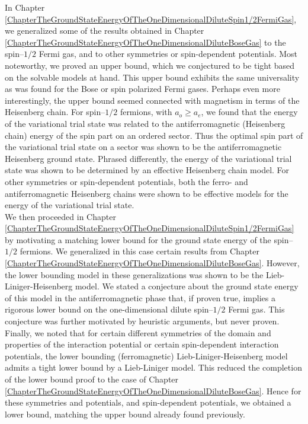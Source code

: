 In Chapter \ref{ChapterTheGroundStateEnergyOfTheOneDimensionalDiluteSpin1/2FermiGas}, we generalized some of the results obtained in Chapter \ref{ChapterTheGroundStateEnergyOfTheOneDimensionalDiluteBoseGas} to the spin--$ 1/2 $ Fermi gas, and to other symmetries or spin-dependent potentials. Most noteworthy, we proved an upper bound, which we conjectured to be tight based on the solvable models at hand. This upper bound exhibits the same universality as was found for the Bose or spin polarized Fermi gases. Perhaps even more interestingly, the upper bound seemed connected with magnetism in terms of the Heisenberg chain. For spin--$ 1/2 $ fermions, with $ a_o\geq a_e $, we found that the energy of the variational trial state was related to the antiferromagnetic (Heisenberg chain) energy of the spin part on an ordered sector. Thus the optimal spin part of the variational trial state on a sector was shown to be the antiferromagnetic Heisenberg ground state. Phrased differently, the energy of the variational trial state was shown to be determined by an effective Heisenberg chain model. For other symmetries or spin-dependent potentials, both the ferro- and antiferromagnetic Heisenberg chains were shown to be effective models for the energy of the variational trial state.\\
We then proceeded in Chapter \ref{ChapterTheGroundStateEnergyOfTheOneDimensionalDiluteSpin1/2FermiGas} by motivating a matching lower bound for the ground state energy of the spin--$ 1/2 $ fermions. We generalized in this case certain results from Chapter \ref{ChapterTheGroundStateEnergyOfTheOneDimensionalDiluteBoseGas}. However, the lower bounding model in these generalizations was shown to be the Lieb-Liniger-Heisenberg model. We stated a conjecture about the ground state energy of this model in the antiferromagnetic phase that, if proven true, implies a rigorous lower bound on the one-dimensional dilute spin--$ 1/2 $ Fermi gas. This conjecture was further motivated by heuristic arguments, but never proven. Finally, we noted that for certain different symmetries of the domain and properties of the interaction potential or certain spin-dependent interaction potentials, the lower bounding (ferromagnetic) Lieb-Liniger-Heisenberg model admits a tight lower bound by a Lieb-Liniger model. This reduced the completion of the lower bound proof to the case of Chapter \ref{ChapterTheGroundStateEnergyOfTheOneDimensionalDiluteBoseGas}. Hence for these symmetries and potentials, and spin-dependent potentials, we obtained a lower bound, matching the upper bound already found previously.

